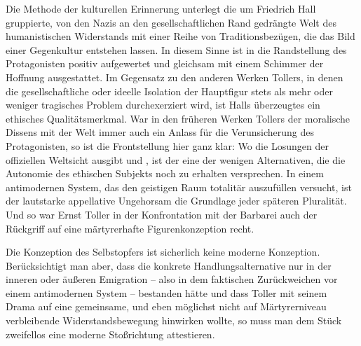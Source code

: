 Die Methode der kulturellen Erinnerung unterlegt die um Friedrich Hall
gruppierte, von den Nazis an den gesellschaftlichen Rand gedrängte Welt des
humanistischen Widerstands mit einer Reihe von Traditionsbezügen, die das
Bild einer  Gegenkultur entstehen lassen. In diesem Sinne
ist in  die Randstellung des Protagonisten positiv
aufgewertet und gleichsam mit einem Schimmer der Hoffnung ausgestattet. Im
Gegensatz zu den anderen Werken Tollers, in denen die gesellschaftliche oder
ideelle Isolation der Hauptfigur stets als mehr oder weniger tragisches Problem
durchexerziert wird, ist Halls überzeugtes 
ein ethisches Qualitätsmerkmal. War in den früheren Werken Tollers der
moralische Dissens mit der Welt immer auch ein Anlass für die Verunsicherung
des Protagonisten,
so ist die Frontstellung hier ganz klar: Wo \Cite{der Vater der Lüge}
 die Losungen der offiziellen Weltsicht ausgibt und
\Cite{der Antichrist regiert} , ist der \Cite{der Weg der
  Wahrheit} eine der wenigen Alternativen, die die Autonomie des ethischen
Subjekts noch zu erhalten versprechen. In einem antimodernen System, das den geistigen Raum
totalitär auszufüllen versucht, ist der lautstarke appellative Ungehorsam die
Grundlage jeder späteren Pluralität. Und so war Ernst Toller in  der
Konfrontation mit der Barbarei auch der Rückgriff auf
eine märtyrerhafte Figurenkonzeption recht. 

Die Konzeption des Selbstopfers ist
sicherlich keine moderne Konzeption. Berücksichtigt man aber, dass die
konkrete
Handlungsalternative nur in der inneren oder äußeren Emigration -- also in dem
faktischen Zurückweichen vor einem antimodernen System -- bestanden hätte und
dass Toller mit seinem Drama auf eine gemeinsame, und eben möglichst nicht auf
Märtyrerniveau verbleibende Widerstandsbewegung hinwirken wollte, so muss
man dem Stück zweifellos eine moderne Stoßrichtung attestieren. 

